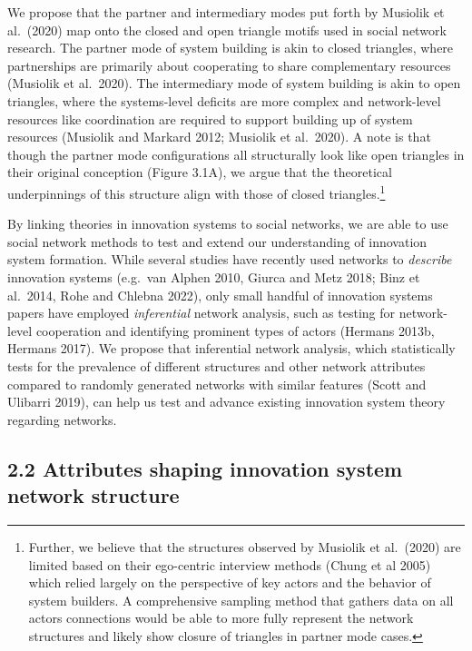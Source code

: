 \documentclass[twoside,12pt,final]{ucthesis-CA2012}
\begin{document}
\begin{ucmainmatter}
We propose that the partner and intermediary modes put forth by Musiolik
et al.~(2020) map onto the closed and open triangle motifs used in
social network research. The partner mode of system building is akin to
closed triangles, where partnerships are primarily about cooperating to
share complementary resources (Musiolik et al.~2020). The intermediary
mode of system building is akin to open triangles, where the
systems-level deficits are more complex and network-level resources like
coordination are required to support building up of system resources
(Musiolik and Markard 2012; Musiolik et al.~2020). A note is that though
the partner mode configurations all structurally look like open
triangles in their original conception (Figure 3.1A), we argue that the
theoretical underpinnings of this structure align with those of closed
triangles.\footnote{Further, we believe that the structures observed by Musiolik et
  al.~(2020) are limited based on their \textquotesingle ego-centric\textquotesingle{} interview
  methods (Chung et al 2005) which relied largely on the perspective
  of key actors and the behavior of system builders. A comprehensive
  sampling method that gathers data on all actors\textquotesingle{} connections would
  be able to more fully represent the network structures and likely
  show \textquotesingle closure\textquotesingle{} of triangles in partner mode cases.}

By linking theories in innovation systems to social networks, we are
able to use social network methods to test and extend our understanding
of innovation system formation. While several studies have recently used
networks to \emph{describe} innovation systems (e.g.~van Alphen 2010, Giurca
and Metz 2018; Binz et al.~2014, Rohe and Chlebna 2022), only small
handful of innovation systems papers have employed \emph{inferential} network
analysis, such as testing for network-level cooperation and identifying
prominent types of actors (Hermans 2013b, Hermans 2017). We propose that
inferential network analysis, which statistically tests for the
prevalence of different structures and other network attributes compared
to randomly generated networks with similar features (Scott and Ulibarri
2019), can help us test and advance existing innovation system theory
regarding networks.

\hypertarget{attributes-shaping-innovation-system-network-structure}{%
\subsection{2.2 Attributes shaping innovation system network structure}\label{attributes-shaping-innovation-system-network-structure}}


\end{ucmainmatter}
\end{document}
